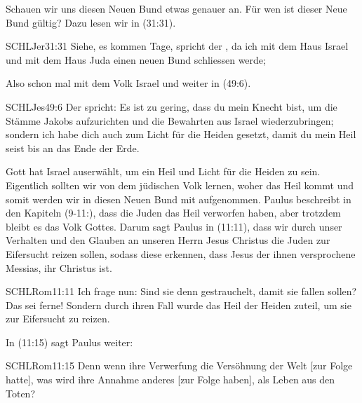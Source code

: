     \begin{otsblock}
        Schauen wir uns diesen Neuen Bund etwas genauer an.
        Für wen ist dieser Neue Bund gültig? Dazu lesen wir in (31:31).
        \begin{bibelbox}{SCHL}{Jer}{31:31}
           Siehe, es kommen Tage, spricht der \herr{}, da ich mit dem Haus Israel und mit dem Haus Juda einen neuen Bund schliessen werde;
        \end{bibelbox} 
        Also schon mal mit dem Volk Israel und weiter in (49:6).
        \begin{bibelbox}{SCHL}{Jes}{49:6}
           Der \herr{} spricht: Es ist zu gering, dass du mein Knecht bist, um die Stämme Jakobs aufzurichten und die Bewahrten aus Israel wiederzubringen; sondern ich habe dich auch zum Licht für die Heiden gesetzt, damit du mein Heil seist bis an das Ende der Erde.
        \end{bibelbox}
        Gott hat Israel auserwählt, um ein Heil und Licht für die Heiden zu sein.\\
        Eigentlich sollten wir von dem jüdischen Volk lernen, woher das Heil kommt und somit werden wir in diesen Neuen Bund mit aufgenommen. Paulus beschreibt in den Kapiteln (9-11:), dass die Juden das Heil verworfen haben, aber trotzdem bleibt es das Volk Gottes. Darum sagt Paulus in (11:11), dass wir durch unser Verhalten und den Glauben an unseren Herrn Jesus Christus die Juden zur Eifersucht reizen sollen, sodass diese erkennen, dass Jesus der ihnen versprochene Messias, ihr Christus ist.  
        \begin{bibelbox}{SCHL}{Rom}{11:11}
            Ich frage nun: Sind sie denn gestrauchelt, damit sie fallen sollen? Das sei ferne! Sondern durch ihren Fall wurde das Heil der Heiden zuteil, um sie zur Eifersucht zu reizen.
        \end{bibelbox}
        In (11:15) sagt Paulus weiter:
        \begin{bibelbox}{SCHL}{Rom}{11:15}
            Denn wenn ihre Verwerfung die Versöhnung der Welt [zur Folge hatte], was wird ihre Annahme anderes [zur Folge haben], als Leben aus den Toten?
        \end{bibelbox}
    \end{otsblock}     
